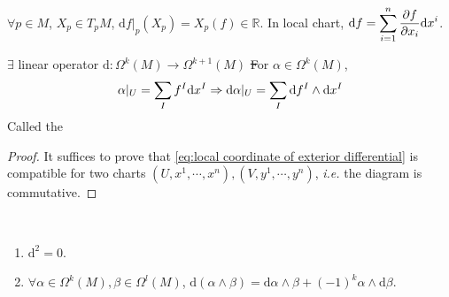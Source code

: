 $ \forall p\in M $,  $ X_p\in T_pM $,  $ \mathrm{d}f|_p(X_p)=X_p(f)\in \mathbb{R} $.
In local chart,  $ \mathrm{d}f=\displaystyle\sum_{i=1}^n\frac{\partial f}{\partial x_i}\mathrm{d}x^i $.
\begin{theorem}
    $ \exists $ linear operator  $ \mathrm{d}:\Omega^k(M)\rightarrow \Omega^{k+1}(M) $  \st
    For $ \alpha\in \Omega^k(M) $,
    \begin{equation}
        \alpha|_U=\displaystyle\sum_If^I\mathrm{d}x^I \Rightarrow \mathrm{d}\alpha|_U=\displaystyle\sum_{I}\mathrm{d}f^I\wedge\mathrm{d}x^I \label{eq:local coordinate of exterior differential}
    \end{equation}
    Called the 
\end{theorem}
\begin{proof}
    It suffices to prove that \eqref{eq:local coordinate of exterior differential} is compatible for two charts  $ (U,x^1,\cdots,x^n),(V,y^1,\cdots,y^n) $, \textit{i.e.} the diagram is commutative.
    \footnotesize
\end{proof}
\begin{theorem}
    \,
    \begin{enumerate}[label=(\arabic*)]
        \item $ \mathrm{d}^2=0 $.
        \item  $ \forall \alpha\in \Omega^k(M),\beta\in \Omega^l(M) $,  $ \mathrm{d}(\alpha\wedge\beta)=\mathrm{d}\alpha\wedge\beta+(-1)^{k}\alpha\wedge\mathrm{d}\beta $.
    \end{enumerate}
\end{theorem}
